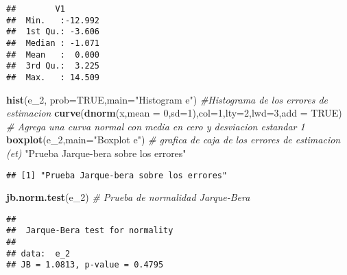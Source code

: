 \documentclass[
]{article}
\newenvironment{Shaded}{\begin{snugshade}}{\end{snugshade}}
\newcommand{\CommentTok}[1]{\textcolor[rgb]{0.56,0.35,0.01}{\textit{#1}}}
\newcommand{\DataTypeTok}[1]{\textcolor[rgb]{0.13,0.29,0.53}{#1}}
\newcommand{\DecValTok}[1]{\textcolor[rgb]{0.00,0.00,0.81}{#1}}
\newcommand{\KeywordTok}[1]{\textcolor[rgb]{0.13,0.29,0.53}{\textbf{#1}}}
\newcommand{\NormalTok}[1]{#1}
\newcommand{\OtherTok}[1]{\textcolor[rgb]{0.56,0.35,0.01}{#1}}
\newcommand{\StringTok}[1]{\textcolor[rgb]{0.31,0.60,0.02}{#1}}
\begin{document}
\begin{verbatim}
##        V1         
##  Min.   :-12.992  
##  1st Qu.: -3.606  
##  Median : -1.071  
##  Mean   :  0.000  
##  3rd Qu.:  3.225  
##  Max.   : 14.509
\end{verbatim}

\begin{Shaded}
\begin{Highlighting}[]
\KeywordTok{hist}\NormalTok{(e_}\DecValTok{2}\NormalTok{, }\DataTypeTok{prob=}\OtherTok{TRUE}\NormalTok{,}\DataTypeTok{main=}\StringTok{"Histogram e"}\NormalTok{)   }\CommentTok{#Histograma de los errores de estimacion }
\KeywordTok{curve}\NormalTok{(}\KeywordTok{dnorm}\NormalTok{(x,}\DataTypeTok{mean =} \DecValTok{0}\NormalTok{,}\DataTypeTok{sd=}\DecValTok{1}\NormalTok{),}\DataTypeTok{col=}\DecValTok{1}\NormalTok{,}\DataTypeTok{lty=}\DecValTok{2}\NormalTok{,}\DataTypeTok{lwd=}\DecValTok{3}\NormalTok{,}\DataTypeTok{add =} \OtherTok{TRUE}\NormalTok{) }\CommentTok{# Agrega una curva normal con media en cero y desviacion estandar 1 }
\KeywordTok{boxplot}\NormalTok{(e_}\DecValTok{2}\NormalTok{,}\DataTypeTok{main=}\StringTok{"Boxplot e"}\NormalTok{) }\CommentTok{# grafica de caja de los errores de estimacion (et)}
\StringTok{"Prueba Jarque-bera sobre los errores"}
\end{Highlighting}
\end{Shaded}

\begin{verbatim}
## [1] "Prueba Jarque-bera sobre los errores"
\end{verbatim}

\begin{Shaded}
\begin{Highlighting}[]
\KeywordTok{jb.norm.test}\NormalTok{(e_}\DecValTok{2}\NormalTok{) }\CommentTok{# Prueba de normalidad Jarque-Bera }
\end{Highlighting}
\end{Shaded}

\begin{verbatim}
## 
##  Jarque-Bera test for normality
## 
## data:  e_2
## JB = 1.0813, p-value = 0.4795
\end{verbatim}
\end{document}
